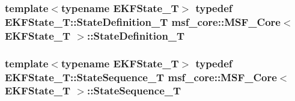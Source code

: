 \hypertarget{classmsf__core_1_1MSF__Core_ace7a0e25e3945f3e84a6b16f72d1f1dd}{
\subsubsection[{State\-Definition\-\_\-\-T}]{\setlength{\rightskip}{0pt plus 5cm}template$<$typename E\-K\-F\-State\-\_\-\-T$>$ typedef E\-K\-F\-State\-\_\-\-T\-::\-State\-Definition\-\_\-\-T {\bf msf\-\_\-core\-::\-M\-S\-F\-\_\-\-Core}$<$ E\-K\-F\-State\-\_\-\-T $>$\-::{\bf State\-Definition\-\_\-\-T}}}\label{classmsf__core_1_1MSF__Core_ace7a0e25e3945f3e84a6b16f72d1f1dd}
\hypertarget{classmsf__core_1_1MSF__Core_af8de96f8f0a8677c79c12563f86b26d3}{
\subsubsection[{State\-Sequence\-\_\-\-T}]{\setlength{\rightskip}{0pt plus 5cm}template$<$typename E\-K\-F\-State\-\_\-\-T$>$ typedef E\-K\-F\-State\-\_\-\-T\-::\-State\-Sequence\-\_\-\-T {\bf msf\-\_\-core\-::\-M\-S\-F\-\_\-\-Core}$<$ E\-K\-F\-State\-\_\-\-T $>$\-::{\bf State\-Sequence\-\_\-\-T}}}\label{classmsf__core_1_1MSF__Core_af8de96f8f0a8677c79c12563f86b26d3}


